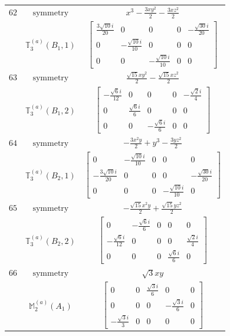 \documentclass[fleqn,8pt,landscape]{jsarticle}
\begin{document}
\begin{longtable}{ccc}
$ 62 $ & $ \text{symmetry} $ & $ x^{3} - \frac{3 x y^{2}}{2} - \frac{3 x z^{2}}{2} $ \\
$  $ & $ \mathbb{T}_{3}^{(a)}(B_{1},1) $ & $ \begin{bmatrix} \frac{3 \sqrt{10} i}{20} & 0 & 0 & 0 & - \frac{\sqrt{30} i}{20} \\ 0 & - \frac{\sqrt{10} i}{10} & 0 & 0 & 0 \\ 0 & 0 & - \frac{\sqrt{10} i}{10} & 0 & 0 \end{bmatrix} $ \\ \hline
$ 63 $ & $ \text{symmetry} $ & $ \frac{\sqrt{15} x y^{2}}{2} - \frac{\sqrt{15} x z^{2}}{2} $ \\
$  $ & $ \mathbb{T}_{3}^{(a)}(B_{1},2) $ & $ \begin{bmatrix} - \frac{\sqrt{6} i}{12} & 0 & 0 & 0 & - \frac{\sqrt{2} i}{4} \\ 0 & \frac{\sqrt{6} i}{6} & 0 & 0 & 0 \\ 0 & 0 & - \frac{\sqrt{6} i}{6} & 0 & 0 \end{bmatrix} $ \\ \hline
$ 64 $ & $ \text{symmetry} $ & $ - \frac{3 x^{2} y}{2} + y^{3} - \frac{3 y z^{2}}{2} $ \\
$  $ & $ \mathbb{T}_{3}^{(a)}(B_{2},1) $ & $ \begin{bmatrix} 0 & - \frac{\sqrt{10} i}{10} & 0 & 0 & 0 \\ - \frac{3 \sqrt{10} i}{20} & 0 & 0 & 0 & - \frac{\sqrt{30} i}{20} \\ 0 & 0 & 0 & - \frac{\sqrt{10} i}{10} & 0 \end{bmatrix} $ \\ \hline
$ 65 $ & $ \text{symmetry} $ & $ - \frac{\sqrt{15} x^{2} y}{2} + \frac{\sqrt{15} y z^{2}}{2} $ \\
$  $ & $ \mathbb{T}_{3}^{(a)}(B_{2},2) $ & $ \begin{bmatrix} 0 & - \frac{\sqrt{6} i}{6} & 0 & 0 & 0 \\ - \frac{\sqrt{6} i}{12} & 0 & 0 & 0 & \frac{\sqrt{2} i}{4} \\ 0 & 0 & 0 & \frac{\sqrt{6} i}{6} & 0 \end{bmatrix} $ \\ \hline
$ 66 $ & $ \text{symmetry} $ & $ \sqrt{3} x y $ \\
$  $ & $ \mathbb{M}_{2}^{(a)}(A_{1}) $ & $ \begin{bmatrix} 0 & 0 & \frac{\sqrt{3} i}{6} & 0 & 0 \\ 0 & 0 & 0 & - \frac{\sqrt{3} i}{6} & 0 \\ - \frac{\sqrt{3} i}{3} & 0 & 0 & 0 & 0 \end{bmatrix} $ \\ \hline

\end{longtable}
\end{document}
